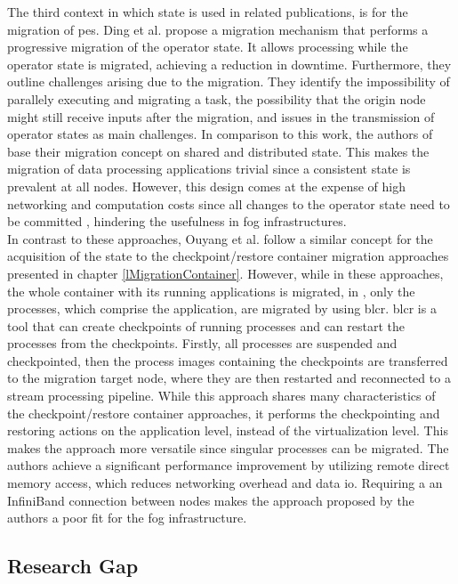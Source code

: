 The third context in which state is used in related publications, is for the migration of \gls{pe}s. Ding et al. \cite{Ding.15012015} propose a migration mechanism that performs a progressive migration of the operator state. It allows processing while the operator state is migrated, achieving a reduction in downtime. Furthermore, they outline challenges arising due to the migration. They identify the impossibility of parallely executing and migrating a task, the possibility that the origin node might still receive inputs after the migration, and issues in the transmission of operator states as main challenges. In comparison to this work, the authors of \cite{Power.2010} base their migration concept on shared and distributed state. This makes the migration of data processing applications trivial since a consistent state is prevalent at all nodes. However, this design comes at the expense of high networking and computation costs since all changes to the operator state need to be committed \cite{Ding.15012015}, hindering the usefulness in fog infrastructures.\\
In contrast to these approaches, Ouyang et al. \cite{Ouyang.2011} follow a similar concept for the acquisition of the state to the checkpoint/restore container migration approaches presented in chapter \ref{lMigrationContainer}. However, while in these approaches, the whole container with its running applications is migrated, in \cite{Ouyang.2011}, only the processes, which comprise the application, are migrated by using \gls{blcr}. \gls{blcr} is a tool that can create checkpoints of running processes and can restart the processes from the checkpoints. Firstly, all processes are suspended and checkpointed, then the process images containing the checkpoints are transferred to the migration target node, where they are then restarted and reconnected to a stream processing pipeline. While this approach shares many characteristics of the checkpoint/restore container approaches, it performs the checkpointing and restoring actions on the application level, instead of the virtualization level. This makes the approach more versatile since singular processes can be migrated. The authors achieve a significant performance improvement by utilizing remote direct memory access, which reduces networking overhead and data \gls{io}. Requiring a an InfiniBand connection between nodes makes the approach proposed by the authors a poor fit for the fog infrastructure.

\subsection{Research Gap}
\label{lResearchGap}

